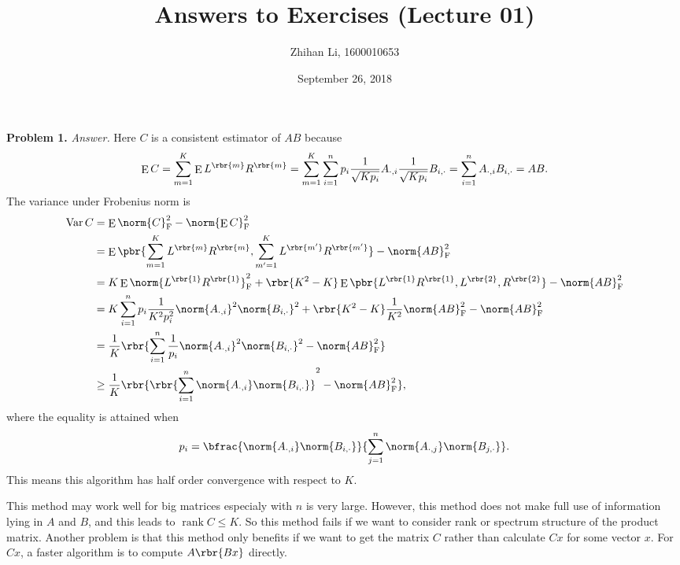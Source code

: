 \documentclass[english, nochinese]{pnote}
\title{Answers to Exercises (Lecture 01)}
\author{Zhihan Li, 1600010653}
\date{September 26, 2018}
\DeclareMathOperator\ope{\mathrm{E}}
\DeclareMathOperator\opvar{\mathrm{Var}}
\DeclareMathOperator\oprank{\mathrm{rank}}
\begin{document}
\maketitle

\textbf{Problem 1.} \textit{Answer.} Here $C$ is a consistent estimator of $ A B $ because
\begin{equation}
\ope C = \sum_{ m = 1 }^K \ope L^{\rbr{m}} R^{\rbr{m}} = \sum_{ m = 1 }^K \sum_{ i = 1 }^n p_i \frac{1}{\sqrt{ K p_i }} A_{ \cdot, i } \frac{1}{\sqrt{ K p_i }} B_{ i, \cdot } = \sum_{ i = 1 }^n A_{ \cdot, i } B_{ i, \cdot } = A B.
\end{equation}
The variance under Frobenius norm is
\begin{equation}
\begin{split}
\opvar C &= \ope \norm{C}_{\text{F}}^2 - \norm{ \ope C }_{\text{F}}^2 \\
&= \ope \pbr{ \sum_{ m = 1 }^K L^{\rbr{m}} R^{\rbr{m}}, \sum_{ m' = 1 }^K L^{\rbr{m'}} R^{\rbr{m'}} } - \norm{ A B }_{\text{F}}^2 \\
&= K \ope \norm{ L^{\rbr{1}} R^{\rbr{1}} }_{\text{F}}^2 + \rbr{ K^2 - K } \ope \pbr{ L^{\rbr{1}} R^{\rbr{1}}, L^{\rbr{2}}, R^{\rbr{2}} } -\norm{ A B }_{\text{F}}^2 \\
&= K \sum_{ i = 1 }^n p_i \frac{1}{ K^2  p_i^2} \norm{A_{ \cdot, i }}^2 \norm{B_{ i, \cdot }}^2 + \rbr{ K^2 - K } \frac{1}{K^2} \norm{ A B }_{\text{F}}^2 - \norm{ A B }_{\text{F}}^2 \\
&= \frac{1}{K} \rbr{ \sum_{ i = 1 }^n \frac{1}{p_i} \norm{A_{ \cdot, i }}^2 \norm{B_{ i, \cdot }}^2 - \norm{ A B }_{\text{F}}^2 } \\
&\ge \frac{1}{K} \rbr{ \rbr{ \sum_{ i = 1 }^n \norm{A_{ \cdot, i }} \norm{B_{ i, \cdot }} }^2 - \norm{ A B }_{\text{F}}^2 },
\end{split}
\end{equation}
where the equality is attained when
\begin{equation}
p_i = \bfrac{ \norm{A_{ \cdot, i }} \norm{B_{ i, \cdot }} }{ \sum_{ j = 1 }^n \norm{A_{ \cdot, j }} \norm{B_{ j, \cdot }} }.
\end{equation}
This means this algorithm has half order convergence with respect to $K$.

This method may work well for big matrices especialy with $n$ is very large. However, this method does not make full use of information lying in $A$ and $B$, and this leads to $ \oprank C \le K $. So this method fails if we want to consider rank or spectrum structure of the product matrix. Another problem is that this method only benefits if we want to get the matrix $C$ rather than calculate $ C x $ for some vector $x$. For $ C x $, a faster algorithm is to compute $ A \rbr{ B x } $ directly.
\end{document}
